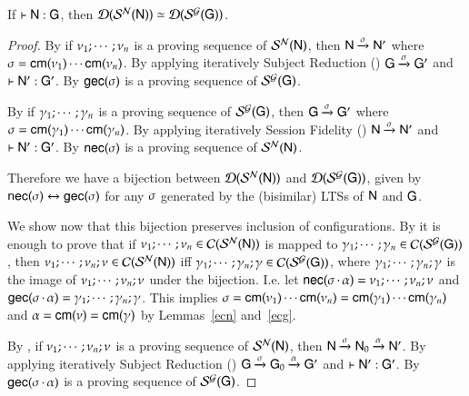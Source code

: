 %
\begin{theorem}[Isomorphism]
 If $\vdash {\sf N} :{\sf G}$, then $\mathcal{D}(\mathcal{S}^{\mathcal{N}}({\sf N})) \simeq \mathcal{D}(\mathcal{S}^{\mathcal{G}}({\sf G}))$.
\end{theorem}
\begin{proof}
  By  if ${\nu_1};\cdots;\nu_n$ is a
  proving sequence of $\mathcal{S}^{\mathcal{N}}({\sf N})$, then ${\sf N}\xrightarrow{\sigma}{\sf N}'$
  where $\sigma={\sf cm}(\nu_1)\cdots{\sf cm}(\nu_n)$. By  applying iteratively  Subject
  Reduction () ${\sf G}\xrightarrow{\sigma}{\sf G}'$ and
  $\vdash {\sf N}' :{\sf G}'$.  By  %
  ${\sf gec}(\sigma)$ is a
  proving sequence of $\mathcal{S}^{\mathcal{G}}({\sf G})$.
  
  By  if ${\gamma_1};\cdots;\gamma_n$ is a
  proving sequence of $\mathcal{S}^{\mathcal{G}}({\sf G})$, then ${\sf G}\xrightarrow{\sigma}{\sf G}'$ where
  $\sigma={\sf cm}(\gamma_1)\cdots{\sf cm}(\gamma_n)$. By  applying iteratively  Session
  Fidelity () ${\sf N}\xrightarrow{\sigma}{\sf N}'$ and
  $\vdash {\sf N}' :{\sf G}'$.  By  %
  ${\sf nec}(\sigma)$ is a
  proving sequence of $\mathcal{S}^{\mathcal{N}}({\sf N})$.
  
  
  
Therefore we have a bijection between $\mathcal{D}(\mathcal{S}^{\mathcal{N}}({\sf N}))$ and
$\mathcal{D}(\mathcal{S}^{\mathcal{G}}({\sf G}))$, given by ${\sf nec}(\sigma) \leftrightarrow {\sf gec}(\sigma)$
for any $\sigma$ generated by the (bisimilar) LTSs of ${\sf N}$ and ${\sf G}$.
 

   We show now that this bijection preserves inclusion of
  configurations.  By
   it is enough to prove that if 
  ${\nu_1};\cdots;\nu_n \in
  \mathcal{C}(\mathcal{S}^{\mathcal{N}}({\sf N}))$ is mapped to ${\gamma_1};\cdots;\gamma_n \in \mathcal{C}(\mathcal{S}^{\mathcal{G}}({\sf G}))$, then
  ${\nu_1};\cdots;\nu_n;\nu \in
  \mathcal{C}(\mathcal{S}^{\mathcal{N}}({\sf N}))$  iff  %
  ${\gamma_1};\cdots;\gamma_n;\gamma \in
  \mathcal{C}(\mathcal{S}^{\mathcal{G}}({\sf G}))$,  where
  ${\gamma_1};\cdots;\gamma_n;\gamma$ is the image of
${\nu_1};\cdots;\nu_n;\nu$ under the bijection. I.e. let ${\sf nec}(\sigma\,{\cdot}\,\alpha) =
{\nu_1};\cdots;\nu_n;\nu$ and ${\sf gec}(\sigma\,{\cdot}\,\alpha) =
{\gamma_1};\cdots;\gamma_n;\gamma$. This implies $\sigma={\sf cm}(\nu_1)\cdots{\sf cm}(\nu_n)=
{\sf cm}(\gamma_1)\cdots{\sf cm}(\gamma_n)$ and $\alpha={\sf cm}(\nu)={\sf cm}(\gamma)$ by  Lemmas~\ref{ecn} and~\ref{ecg}. 

By , if
${\nu_1};\cdots;\nu_n;\nu$ is a proving sequence of
$\mathcal{S}^{\mathcal{N}}({\sf N})$, then ${\sf N}\xrightarrow{\sigma}{\sf N}_0\xrightarrow{\alpha}{\sf N}'$.
By  applying iteratively  Subject Reduction ()
${\sf G}\xrightarrow{\sigma}{\sf G}_0\xrightarrow{\alpha}{\sf G}'$ and $\vdash {\sf N}' :{\sf G}'$.
By  %
${\sf gec}(\sigma\,{\cdot}\,\alpha)$ is a proving
sequence of $\mathcal{S}^{\mathcal{G}}({\sf G})$.


\end{proof}
